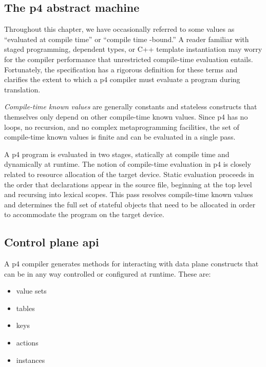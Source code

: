 \subsection*{The \acrshort{p4} abstract machine}

Throughout this chapter, we have occasionally referred to some values as
``evaluated at compile time'' or ``compile time -bound.'' A reader familiar with staged programming,
dependent types, or C++ template instantiation may worry for the compiler
performance that unrestricted compile-time evaluation entails. Fortunately, the
\pfs specification has a rigorous definition for these terms and clarifies the
extent to which a \acrshort{p4} compiler must evaluate a program during
translation.

\emph{Compile-time known values} are generally constants and stateless
constructs that themselves only depend on other compile-time known values. Since
\acrshort{p4} has no loops, no recursion, and no complex metaprogramming
facilities, the set of compile-time known values is finite and can be evaluated
in a single pass.

A \acrshort{p4} program is evaluated in two stages, statically at compile time
and dynamically at runtime. The notion of compile-time evaluation in
\acrshort{p4} is closely related to resource allocation of the target device.
Static evaluation proceeds in the order that declarations appear in the source
file, beginning at the top level and recursing into lexical scopes. This pass
resolves compile-time known values and determines the full set of stateful
objects that need to be allocated in order to accommodate the program on the
target device.

\subsection*{Control plane \acrshort{api}}

A \acrshort{p4} compiler generates methods for interacting with data plane
constructs that can be in any way controlled or configured at runtime. These are:

\begin{itemize}
	\item value sets
	\item tables
	\item keys
	\item actions
	\item \extern{} instances
\end{itemize}

